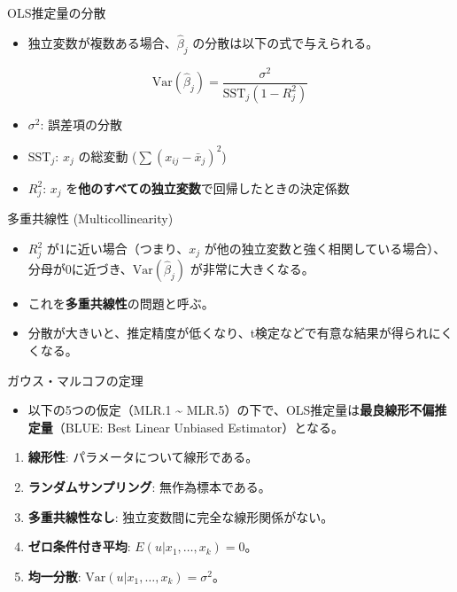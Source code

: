 \documentclass[
  ignorenonframetext,
]{beamer}
\providecommand{\tightlist}{%
  \setlength{\itemsep}{0pt}\setlength{\parskip}{0pt}}
\begin{document}
\begin{frame}{OLS推定量の分散}
\protect\hypertarget{olsux63a8ux5b9aux91cfux306eux5206ux6563-1}{}
\begin{itemize}
\tightlist
\item
  独立変数が複数ある場合、\(\hat{\beta}_j\)
  の分散は以下の式で与えられる。
\end{itemize}

\[ \text{Var}(\hat{\beta}_j) = \frac{\sigma^2}{\text{SST}_j (1 - R_j^2)} \]

\begin{itemize}
\tightlist
\item
  \(\sigma^2\): 誤差項の分散
\item
  \(\text{SST}_j\): \(x_j\) の総変動 (\(\sum (x_{ij} - \bar{x}_j)^2\))
\item
  \(R_j^2\): \(x_j\)
  を\textbf{他のすべての独立変数}で回帰したときの決定係数
\end{itemize}
\end{frame}

\begin{frame}{多重共線性 (Multicollinearity)}
\protect\hypertarget{ux591aux91cdux5171ux7ddaux6027-multicollinearity}{}
\begin{itemize}
\tightlist
\item
  \(R_j^2\) が1に近い場合（つまり、\(x_j\)
  が他の独立変数と強く相関している場合）、分母が0に近づき、\(\text{Var}(\hat{\beta}_j)\)
  が非常に大きくなる。
\item
  これを\textbf{多重共線性}の問題と呼ぶ。
\item
  分散が大きいと、推定精度が低くなり、t検定などで有意な結果が得られにくくなる。
\end{itemize}
\end{frame}

\begin{frame}{ガウス・マルコフの定理}
\protect\hypertarget{ux30acux30a6ux30b9ux30deux30ebux30b3ux30d5ux306eux5b9aux7406}{}
\begin{itemize}
\tightlist
\item
  以下の5つの仮定（MLR.1 \textasciitilde{}
  MLR.5）の下で、OLS推定量は\textbf{最良線形不偏推定量}（BLUE: Best
  Linear Unbiased Estimator）となる。
\end{itemize}

\begin{enumerate}
\tightlist
\item
  \textbf{線形性}: パラメータについて線形である。
\item
  \textbf{ランダムサンプリング}: 無作為標本である。
\item
  \textbf{多重共線性なし}: 独立変数間に完全な線形関係がない。
\item
  \textbf{ゼロ条件付き平均}: \(E(u|x_1, \dots, x_k) = 0\)。
\item
  \textbf{均一分散}: \(\text{Var}(u|x_1, \dots, x_k) = \sigma^2\)。
\end{enumerate}
\end{frame}
\end{document}
